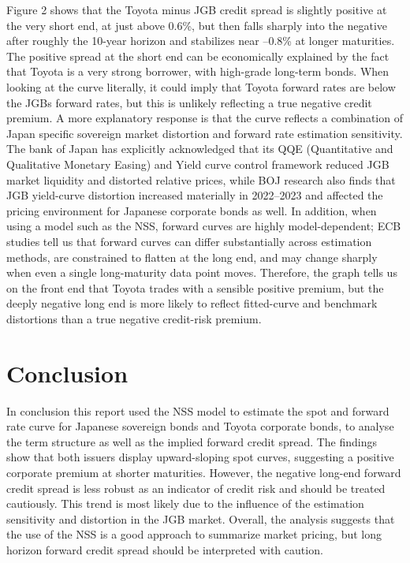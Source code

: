 \documentclass[11pt,oneside]{scrartcl}
\begin{document}
Figure 2 shows that the Toyota minus JGB credit spread is slightly positive at the very short end, at just above 0.6\%, but then falls sharply into the negative after roughly the 10-year horizon and stabilizes near –0.8\% at longer maturities. The positive spread at the short end can be economically explained by the fact that Toyota is a very strong borrower, with high-grade long-term bonds. When looking at the curve literally, it could imply that Toyota forward rates are below the JGBs forward rates, but this is unlikely reflecting a true negative credit premium. A more explanatory response is that the curve reflects a combination of Japan specific sovereign market distortion and forward rate estimation sensitivity. The bank of Japan has explicitly acknowledged that its QQE (Quantitative and Qualitative Monetary Easing) and Yield curve control framework reduced JGB market liquidity and distorted relative prices, while BOJ research also finds that JGB yield-curve distortion increased materially in 2022–2023 and affected the pricing environment for Japanese corporate bonds as well. In addition, when using a model such as the NSS, forward curves are highly model-dependent; ECB studies tell us that forward curves can differ substantially across estimation methods, are constrained to flatten at the long end, and may change sharply when even a single long-maturity data point moves. Therefore, the graph tells us on the front end that Toyota trades with a sensible positive premium, but the deeply negative long end is more likely to reflect fitted-curve and benchmark distortions than a true negative credit-risk premium.

\section{Conclusion}
In conclusion this report used the NSS model to estimate the spot and forward rate curve for Japanese sovereign bonds and Toyota corporate bonds, to analyse the term structure as well as the implied forward credit spread. The findings show that both issuers display upward-sloping spot curves, suggesting a positive corporate premium at shorter maturities. However, the negative long-end forward credit spread is less robust as an indicator of credit risk and should be treated cautiously. This trend is most likely due to the influence of the estimation sensitivity and distortion in the JGB market. Overall, the analysis suggests that the use of the NSS is a good approach to summarize market pricing, but long horizon forward credit spread should be interpreted with caution.

\printbibliography
\nocite{*}
\end{document}

